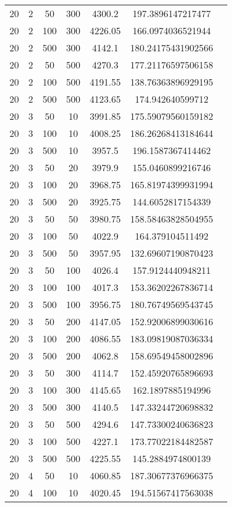 {\begin{longtabu}{S
S
S
S
S
S[round-mode=places,round-precision=0]
S[round-mode=places,round-precision=0]}
20 & 2 & 50 & 300 & 4300.2 & 197.3896147217477 \\
20 & 2 & 100 & 300 & 4226.05 & 166.0974036521944 \\
20 & 2 & 500 & 300 & 4142.1 & 180.24175431902566 \\
20 & 2 & 50 & 500 & 4270.3 & 177.21176597506158 \\
20 & 2 & 100 & 500 & 4191.55 & 138.76363896929195 \\
20 & 2 & 500 & 500 & 4123.65 & 174.942640599712 \\
20 & 3 & 50 & 10 & 3991.85 & 175.59079560159182 \\
20 & 3 & 100 & 10 & 4008.25 & 186.26268413184644 \\
20 & 3 & 500 & 10 & 3957.5 & 196.1587367414462 \\
20 & 3 & 50 & 20 & 3979.9 & 155.0460899216746 \\
20 & 3 & 100 & 20 & 3968.75 & 165.81974399931994 \\
20 & 3 & 500 & 20 & 3925.75 & 144.6052817154339 \\
20 & 3 & 50 & 50 & 3980.75 & 158.58463828504955 \\
20 & 3 & 100 & 50 & 4022.9 & 164.379104511492 \\
20 & 3 & 500 & 50 & 3957.95 & 132.69607190870423 \\
20 & 3 & 50 & 100 & 4026.4 & 157.9124440948211 \\
20 & 3 & 100 & 100 & 4017.3 & 153.36202267836714 \\
20 & 3 & 500 & 100 & 3956.75 & 180.76749569543745 \\
20 & 3 & 50 & 200 & 4147.05 & 152.92006899030616 \\
20 & 3 & 100 & 200 & 4086.55 & 183.09819087036334 \\
20 & 3 & 500 & 200 & 4062.8 & 158.69549458002896 \\
20 & 3 & 50 & 300 & 4114.7 & 152.45920765896693 \\
20 & 3 & 100 & 300 & 4145.65 & 162.1897885194996 \\
20 & 3 & 500 & 300 & 4140.5 & 147.33244720698832 \\
20 & 3 & 50 & 500 & 4294.6 & 147.73300240636823 \\
20 & 3 & 100 & 500 & 4227.1 & 173.77022184482587 \\
20 & 3 & 500 & 500 & 4225.55 & 145.2884974800139 \\
20 & 4 & 50 & 10 & 4060.85 & 187.30677376966375 \\
20 & 4 & 100 & 10 & 4020.45 & 194.51567417563038 \\

\end{longtabu}}
